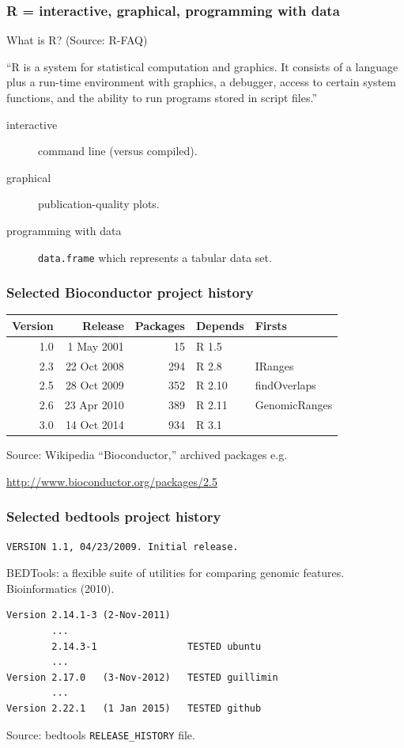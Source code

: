 \documentclass{beamer}
\begin{document}
\begin{frame}
  \frametitle{R = interactive, graphical, programming with data}
  
  What is R? (Source: R-FAQ)

  ``R is a system for statistical computation and graphics. It
  consists of a language plus a run-time environment with graphics, a
  debugger, access to certain system functions, and the ability to run
  programs stored in script files.'' 

  \begin{description}
  \item[interactive] command line (versus compiled).
  \item[graphical] publication-quality plots.
  \item[programming with data] \texttt{data.frame} which represents a
    tabular data set.
  \end{description}
\end{frame}

\begin{frame}
  \frametitle{Selected Bioconductor project history}
  \begin{tabular}{rrrll}
    Version & Release & Packages & Depends & Firsts \\
    \hline
    1.0 & 1 May 2001 & 15 & R 1.5 \\
    2.3 & 22 Oct 2008 & 294 & R 2.8 & IRanges\\
    2.5 & 28 Oct 2009 & 352 & R 2.10 & findOverlaps\\
    2.6 & 23 Apr 2010 & 389 & R 2.11 & GenomicRanges\\
    3.0 & 14 Oct 2014 & 934 & R 3.1
  \end{tabular}

  \vskip 1cm

  Source: Wikipedia ``Bioconductor,'' archived packages e.g.

  \url{http://www.bioconductor.org/packages/2.5}

\end{frame}

\begin{frame}
  \frametitle{Selected bedtools project history}

\begin{verbatim}
VERSION 1.1, 04/23/2009. Initial release.
\end{verbatim}

  BEDTools: a flexible suite of utilities for comparing genomic
  features. Bioinformatics (2010).

\begin{verbatim}
Version 2.14.1-3 (2-Nov-2011)
        ...
        2.14.3-1                TESTED ubuntu
        ...
Version 2.17.0   (3-Nov-2012)   TESTED guillimin
        ...
Version 2.22.1   (1 Jan 2015)   TESTED github
\end{verbatim}

Source: bedtools \verb|RELEASE_HISTORY| file.
  
\end{frame}
\end{document}
